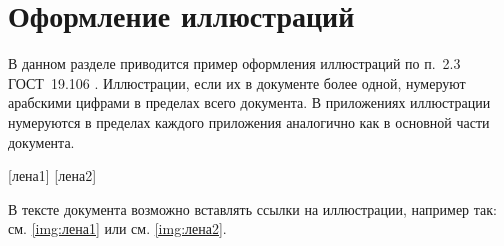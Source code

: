 \section{Оформление иллюстраций}

В данном разделе приводится пример оформления иллюстраций по п.~2.3 ГОСТ~19.106 \cite{gost19106}. Иллюстрации, если их в документе более одной, нумеруют арабскими цифрами в пределах всего документа. В приложениях иллюстрации нумеруются в пределах каждого приложения аналогично как в основной части документа.

[лена1]
[лена2]

В тексте документа возможно вставлять ссылки на иллюстрации, например так: см. \ref{img:лена1} или см. \ref{img:лена2}.


%







%
%
%

